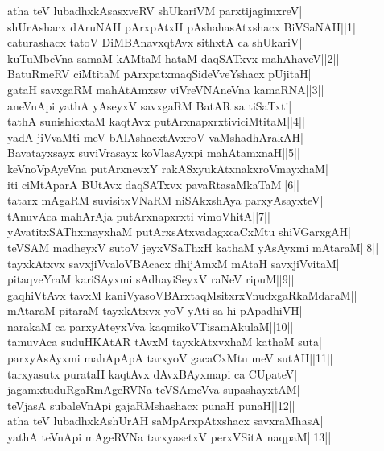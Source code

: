 \documentclass{article}
\begin{document}
atha teV lubadhxkAsasxveRV shUkariVM parxtijagimxreV|\\
shUrAshacx dAruNAH pArxpAtxH pAshahasAtxshacx BiVSaNAH||1||\\
caturashacx tatoV DiMBAnavxqtAvx sithxtA ca shUkariV|\\
kuTuMbeVna samaM kAMtaM hataM daqSATxvx mahAhaveV||2||\\
BatuRmeRV ciMtitaM pArxpatxmaqSideVveYshacx pUjitaH|\\
gataH savxgaRM mahAtAmxsw viVreVNAneVna kamaRNA||3||\\
aneVnApi yathA yAseyxV savxgaRM BatAR sa tiSaTxti|\\
tathA sunishicxtaM kaqtAvx putArxnapxrxtiviciMtitaM||4||\\
yadA jiVvaMti meV bAlAshacxtAvxroV vaMshadhArakAH|\\
Bavatayxsayx suviVrasayx koVlasAyxpi mahAtamxnaH||5||\\
keVnoVpAyeVna putArxnevxY rakASxyukAtxnakxroVmayxhaM|\\
iti ciMtAparA BUtAvx daqSATxvx pavaRtasaMkaTaM||6||\\
tatarx mAgaRM suvisitxVNaRM niSAkxshAya parxyAsayxteV|\\
tAnuvAca mahArAja putArxnapxrxti vimoVhitA||7||\\
yAvatitxSAThxmayxhaM putArxsAtxvadagxcaCxMtu shiVGarxgAH|\\
teVSAM madheyxV sutoV jeyxVSaThxH kathaM yAsAyxmi mAtaraM||8||\\
tayxkAtxvx savxjiVvaloVBAcacx dhijAmxM mAtaH savxjiVvitaM|\\
pitaqveYraM kariSAyxmi sAdhayiSeyxV raNeV ripuM||9||\\
gaqhiVtAvx tavxM kaniVyasoVBArxtaqMsitxrxVnudxgaRkaMdaraM||\\
mAtaraM pitaraM tayxkAtxvx yoV yAti sa hi pApadhiVH|\\
narakaM ca parxyAteyxVva kaqmikoVTisamAkulaM||10||\\
tamuvAca suduHKAtAR tAvxM tayxkAtxvxhaM kathaM suta|\\
parxyAsAyxmi mahApApA tarxyoV gacaCxMtu meV sutAH||11||\\
tarxyasutx purataH kaqtAvx dAvxBAyxmapi ca CUpateV|\\
jagamxtuduRgaRmAgeRVNa teVSAmeVva supashayxtAM|\\
teVjasA subaleVnApi gajaRMshashacx punaH punaH||12||\\
atha teV lubadhxkAshUrAH saMpArxpAtxshacx savxraMhasA|\\
yathA teVnApi mAgeRVNa tarxyasetxV perxVSitA naqpaM||13||\\
\end{document}
